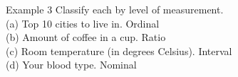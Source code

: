\documentclass[t]{beamer}
\begin{document}
\begin{frame}{Example 3}
Classify each by level of measurement.	\newline\\
(a) \quad Top 10 cities to live in. 	\quad \pause Ordinal \newline\\ \pause
(b) \quad Amount of coffee in a cup. \quad \pause Ratio \newline\\ \pause
(c) \quad Room temperature (in degrees Celsius). \quad \pause Interval \newline\\ \pause
(d) \quad Your blood type. \quad \pause Nominal
\end{frame}
\end{document}
